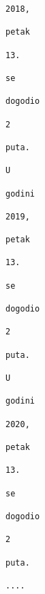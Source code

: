 \documentclass{exam}
\begin{document}
\begin{itemize}
\begin{lstlisting}[caption={Ispis}]
                                                                                                2018,
                                                                                                petak
                                                                                                13.
                                                                                                se
                                                                                                dogodio
                                                                                                2
                                                                                                puta.
                                                                                                U
                                                                                                godini
                                                                                                2019,
                                                                                                petak
                                                                                                13.
                                                                                                se
                                                                                                dogodio
                                                                                                2
                                                                                                puta.
                                                                                                U
                                                                                                godini
                                                                                                2020,
                                                                                                petak
                                                                                                13.
                                                                                                se
                                                                                                dogodio
                                                                                                2
                                                                                                puta.
                                                                                                ....

\end{lstlisting}
\end{itemize}
\end{document}
